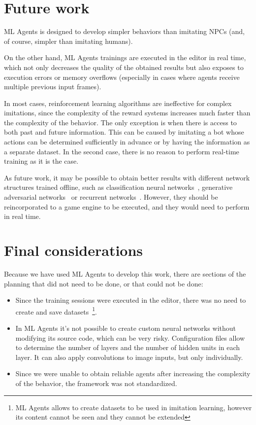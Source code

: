 \section{Future work}


ML Agents is designed to develop simpler behaviors than imitating NPCs (and, of course, simpler than imitating humans).

On the other hand, ML Agents trainings are executed in the editor in real time, which not only decreases the quality of the obtained results but also exposes to execution errors or memory overflows (especially in cases where agents receive multiple previous input frames).

In most cases, reinforcement learning algorithms are ineffective for complex imitations, since the complexity of the reward systems increases much faster than the complexity of the behavior. The only exception is when there is access to both past and future information. This can be caused by imitating a bot whose actions can be determined sufficiently in advance or by having the information as a separate dataset. In the second case, there is no reason to perform real-time training as it is the case.

As future work, it may be possible to obtain better results with different network structures trained offline, such as classification neural networks~\cite{clasnn}, generative adversarial networks~\cite{radford2015unsupervised} or recurrent networks~\cite{zaremba2014recurrent}. However, they should be reincorporated to a game engine to be executed, and they would need to perform in real time.


\section{Final considerations}

Because we have used ML Agents to develop this work, there are sections of the planning that did not need to be done, or that could not be done:

\begin{itemize}
	\item Since the training sessions were executed in the editor, there was no need to create and save datasets~\footnote{ML Agents allows to create datasets to be used in imitation learning, however its content cannot be seen and they cannot be extended}.
	\item In ML Agents it's not possible to create custom neural networks without modifying its source code, which can be very risky. Configuration files allow to determine the number of layers and the number of hidden units in each layer. It can also apply convolutions to image inputs, but only individually. 
	\item Since we were unable to obtain reliable agents after increasing the complexity of the behavior, the framework was not standardized.
\end{itemize}

